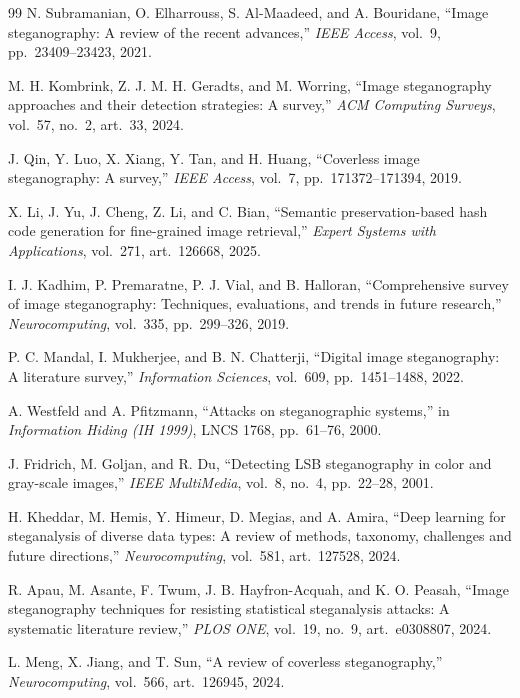 \documentclass[10pt,a4paper]{article}
\theoremstyle{definition}
\begin{document}
\begin{thebibliography}{99}
N. Subramanian, O. Elharrouss, S. Al-Maadeed, and A. Bouridane,
``Image steganography: A review of the recent advances,''
\emph{IEEE Access}, vol.~9, pp.~23409--23423, 2021.

M. H. Kombrink, Z. J. M. H. Geradts, and M. Worring,
``Image steganography approaches and their detection strategies: A survey,''
\emph{ACM Computing Surveys}, vol.~57, no.~2, art.~33, 2024.

J. Qin, Y. Luo, X. Xiang, Y. Tan, and H. Huang,
``Coverless image steganography: A survey,''
\emph{IEEE Access}, vol.~7, pp.~171372--171394, 2019.

X. Li, J. Yu, J. Cheng, Z. Li, and C. Bian,
``Semantic preservation-based hash code generation for fine-grained image retrieval,''
\emph{Expert Systems with Applications}, vol.~271, art.~126668, 2025.

I. J. Kadhim, P. Premaratne, P. J. Vial, and B. Halloran,
``Comprehensive survey of image steganography: Techniques, evaluations, and trends in future research,''
\emph{Neurocomputing}, vol.~335, pp.~299--326, 2019.

P. C. Mandal, I. Mukherjee, and B. N. Chatterji,
``Digital image steganography: A literature survey,''
\emph{Information Sciences}, vol.~609, pp.~1451--1488, 2022.

A. Westfeld and A. Pfitzmann,
``Attacks on steganographic systems,''
in \emph{Information Hiding (IH 1999)}, LNCS 1768, pp.~61--76, 2000.

J. Fridrich, M. Goljan, and R. Du,
``Detecting LSB steganography in color and gray-scale images,''
\emph{IEEE MultiMedia}, vol.~8, no.~4, pp.~22--28, 2001.

H. Kheddar, M. Hemis, Y. Himeur, D. Megias, and A. Amira,
``Deep learning for steganalysis of diverse data types: A review of methods, taxonomy, challenges and future directions,''
\emph{Neurocomputing}, vol.~581, art.~127528, 2024.

R. Apau, M. Asante, F. Twum, J. B. Hayfron-Acquah, and K. O. Peasah,
``Image steganography techniques for resisting statistical steganalysis attacks: A systematic literature review,''
\emph{PLOS ONE}, vol.~19, no.~9, art.~e0308807, 2024.

L. Meng, X. Jiang, and T. Sun,
``A review of coverless steganography,''
\emph{Neurocomputing}, vol.~566, art.~126945, 2024.


\end{thebibliography}
\end{document}
